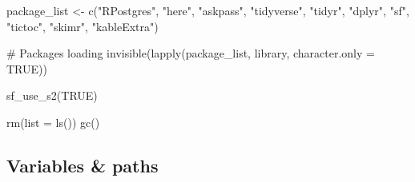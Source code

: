 \documentclass[
  letterpaper,
  DIV=11,
  numbers=noendperiod]{scrreprt}
\newenvironment{Shaded}{\begin{snugshade}}{\end{snugshade}}
\newcommand{\AttributeTok}[1]{\textcolor[rgb]{0.40,0.45,0.13}{#1}}
\newcommand{\CommentTok}[1]{\textcolor[rgb]{0.37,0.37,0.37}{#1}}
\newcommand{\ConstantTok}[1]{\textcolor[rgb]{0.56,0.35,0.01}{#1}}
\newcommand{\FunctionTok}[1]{\textcolor[rgb]{0.28,0.35,0.67}{#1}}
\newcommand{\NormalTok}[1]{\textcolor[rgb]{0.00,0.23,0.31}{#1}}
\newcommand{\OtherTok}[1]{\textcolor[rgb]{0.00,0.23,0.31}{#1}}
\newcommand{\StringTok}[1]{\textcolor[rgb]{0.13,0.47,0.30}{#1}}
\begin{document}
\begin{Shaded}
\begin{Highlighting}[]
\NormalTok{package\_list }\OtherTok{\textless{}{-}} \FunctionTok{c}\NormalTok{(}\StringTok{"RPostgres"}\NormalTok{, }\StringTok{"here"}\NormalTok{, }\StringTok{"askpass"}\NormalTok{, }\StringTok{"tidyverse"}\NormalTok{, }\StringTok{"tidyr"}\NormalTok{, }\StringTok{"dplyr"}\NormalTok{, }\StringTok{"sf"}\NormalTok{, }\StringTok{"tictoc"}\NormalTok{, }\StringTok{"skimr"}\NormalTok{, }\StringTok{"kableExtra"}\NormalTok{)}

\CommentTok{\# Packages loading}
\FunctionTok{invisible}\NormalTok{(}\FunctionTok{lapply}\NormalTok{(package\_list, library, }\AttributeTok{character.only =} \ConstantTok{TRUE}\NormalTok{))}

\FunctionTok{sf\_use\_s2}\NormalTok{(}\ConstantTok{TRUE}\NormalTok{)}

\FunctionTok{rm}\NormalTok{(}\AttributeTok{list =} \FunctionTok{ls}\NormalTok{())}
\FunctionTok{gc}\NormalTok{()}
\end{Highlighting}
\end{Shaded}

\hypertarget{variables-paths}{%
\subsection{Variables \& paths}\label{variables-paths}}
\end{document}
